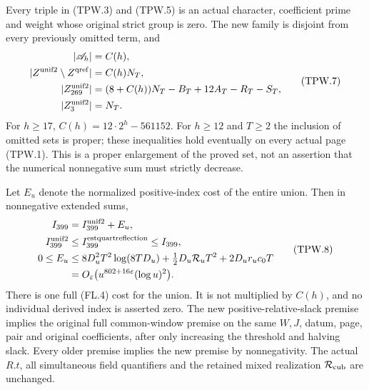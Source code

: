 \begin{theorem}
\label{AC-G174-window}
Every triple in (TPW.3) and (TPW.5) is an actual character, coefficient
prime and weight whose original strict group is zero.
The new family is disjoint from every previously omitted term, and
\[
 \begin{aligned}
 |\mathscr A_h|&=C(h),\\
 |Z^{\rm unif2}\setminus Z^{\rm qref}|&=C(h)N_T,\\
 |Z^{\rm unif2}_{269}|&=(8+C(h))N_T-B_T+12A_T-R_T-S_T,\\
 |Z^{\rm unif2}_3|&=N_T.
 \end{aligned}
 \tag{TPW.7}
\]
For $h\geq17$, $C(h)=12\cdot2^h-561152$.
For $h\geq12$ and $T\geq2$ the inclusion of omitted sets is proper;
these inequalities hold eventually on every actual page (TPW.1).
This is a proper enlargement of the proved set, not an assertion that
the numerical nonnegative sum must strictly decrease.

Let $E_u$ denote the normalized positive-index cost of the entire union.
Then in nonnegative extended sums,
\[
 \begin{aligned}
 I_{399}&=I_{399}^{\rm unif2}+E_u,\\
 I_{399}^{\rm unif2}&\leq I_{399}^{\rm estquartreflection}\leq I_{399},\\
 0\leq E_u&\leq8D_u^2T^2\log(8TD_u)
                 +\tfrac12D_u\mathcal R_uT^2+2D_ur_uc_0T\\
 &=O_\varepsilon\bigl(u^{802+16\varepsilon}(\log u)^2\bigr).
 \end{aligned}
 \tag{TPW.8}
\]
There is one full (FL.4) cost for the union.  It is not multiplied by
$C(h)$, and no individual derived index is asserted zero.
The new positive-relative-slack premise implies the original full
common-window premise on the same $W,J$, datum, page, pair and original
coefficients, after only increasing the threshold and halving slack.
Every older premise implies the new premise by nonnegativity.
The actual $R.t$, all simultaneous field quantifiers and the retained
mixed realization $\mathcal R_{\rm cub}$ are unchanged.
\end{theorem}


